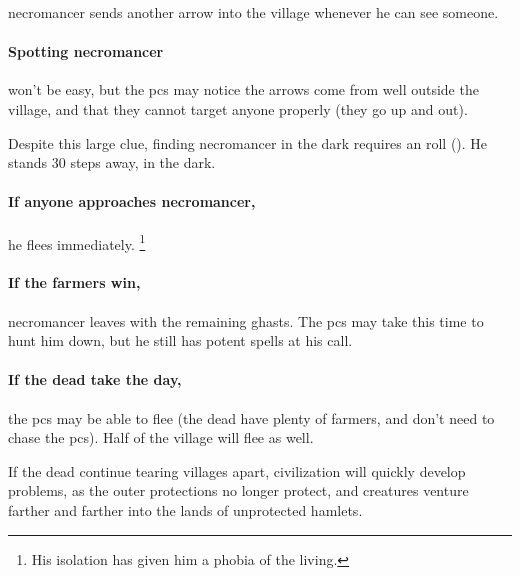 \Gls{necromancer} sends another arrow into the \gls{village} whenever he can see someone.

\paragraph{Spotting \gls{necromancer}}
won't be easy, but the \glspl{pc} may notice the arrows come from well outside the \gls{village}, and that they cannot target anyone properly (they go up and out).

Despite this large clue, finding \gls{necromancer} in the dark requires an  roll (\tn[12]).
He stands 30 \glspl{step} away, in the dark.

\paragraph{If anyone approaches \gls{necromancer},}
he flees immediately.%
\footnote{His isolation has given him a phobia of the living.}

\paragraph{If the farmers win,}
\gls{necromancer} leaves with the remaining ghasts.
The \glspl{pc} may take this time to hunt him down, but he still has potent spells at his call.

\paragraph{If the dead take the day,}
the \glspl{pc} may be able to flee (the dead have plenty of farmers, and don't need to chase the \glspl{pc}).
Half of the \gls{village} will flee as well.

If the dead continue tearing \glspl{village} apart, civilization will quickly develop problems, as the outer protections no longer protect, and creatures venture farther and farther into the lands of unprotected hamlets.





